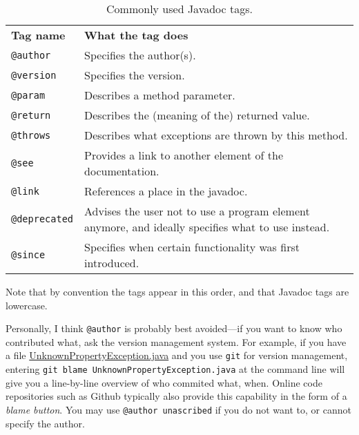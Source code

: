 \begin{table}[!ht]
\vspace{1em}
\caption{Commonly used Javadoc tags.\label{tab:javadoc-tags}}
\begin{tabular}{lp{10cm}}
\vspace{0.5em}
\textbf{Tag name}    & \textbf{What the tag does}                                 \\
\texttt{@author}     & Specifies the author(s).                                   \\
\texttt{@version}    & Specifies the version.                                     \\
\texttt{@param}      & Describes a method parameter.                              \\
\texttt{@return}     & Describes the (meaning of the) returned value.             \\
\texttt{@throws}     & Describes what exceptions are thrown by this method.       \\
\texttt{@see}        & Provides a link to another element of the documentation.   \\
\texttt{@link}       & References a place in the javadoc.                         \\
\texttt{@deprecated} & Advises the user not to use a program element anymore, and ideally specifies what to use instead.     \\
\texttt{@since}      & Specifies when certain functionality was first introduced. \\
\end{tabular}
\end{table}

Note that by convention the tags appear in this order, and that Javadoc tags are lowercase.

Personally, I think \texttt{@author} is probably best avoided---if you want to know who contributed what, ask the version management system. For example, if you have a file \url{UnknownPropertyException.java} and you use \texttt{git} for version management, entering \texttt{git blame UnknownPropertyException.java} at the command line will give you a line-by-line overview of who commited what, when. Online code repositories such as Github typically also provide this capability in the form of a \textit{blame button}.
You may use \texttt{@author unascribed} if you do not want to, or cannot specify the author.

